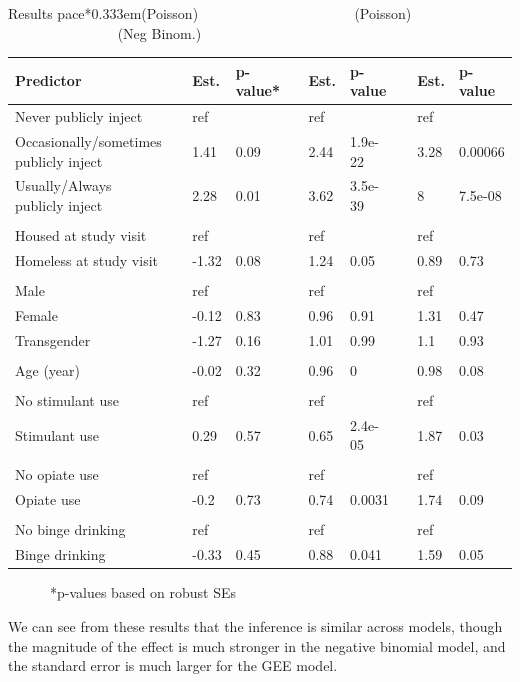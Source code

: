 \documentclass[ignorenonframetext,]{beamer}
\begin{document}
\begin{frame}{Results}
pace*{0.333em}\hspace*{0.333em}\hspace*{0.333em}\hspace*{0.333em}\hspace*{0.333em}\hspace*{0.333em}\hspace*{0.333em}\hspace*{0.333em}\hspace*{0.333em}\hspace*{0.333em}\hspace*{0.333em}(Poisson)
~~~~~~~~~~ ~~~~~~~~~~~(Poisson) ~~~~~~~~~~~~~~~ (Neg Binom.)

\vspace{-8pt}

\begin{longtable}[]{@{}llllllllll@{}}
\toprule
Predictor & & Est. & p-value* & & Est. & p-value & & Est. &
p-value\tabularnewline
\midrule
\endhead
Never publicly inject & & ref & & & ref & & & ref &\tabularnewline
Occasionally/sometimes publicly inject & & 1.41 & 0.09 & & 2.44 &
1.9e-22 & & 3.28 & 0.00066\tabularnewline
Usually/Always publicly inject & & 2.28 & 0.01 & & 3.62 & 3.5e-39 & & 8
& 7.5e-08\tabularnewline
& & & & & & & & &\tabularnewline
Housed at study visit & & ref & & & ref & & & ref &\tabularnewline
Homeless at study visit & & -1.32 & 0.08 & & 1.24 & 0.05 & & 0.89 &
0.73\tabularnewline
& & & & & & & & &\tabularnewline
Male & & ref & & & ref & & & ref &\tabularnewline
Female & & -0.12 & 0.83 & & 0.96 & 0.91 & & 1.31 & 0.47\tabularnewline
Transgender & & -1.27 & 0.16 & & 1.01 & 0.99 & & 1.1 &
0.93\tabularnewline
& & & & & & & & &\tabularnewline
Age (year) & & -0.02 & 0.32 & & 0.96 & 0 & & 0.98 & 0.08\tabularnewline
& & & & & & & & &\tabularnewline
No stimulant use & & ref & & & ref & & & ref &\tabularnewline
Stimulant use & & 0.29 & 0.57 & & 0.65 & 2.4e-05 & & 1.87 &
0.03\tabularnewline
& & & & & & & & &\tabularnewline
No opiate use & & ref & & & ref & & & ref &\tabularnewline
Opiate use & & -0.2 & 0.73 & & 0.74 & 0.0031 & & 1.74 &
0.09\tabularnewline
& & & & & & & & &\tabularnewline
No binge drinking & & ref & & & ref & & & ref &\tabularnewline
Binge drinking & & -0.33 & 0.45 & & 0.88 & 0.041 & & 1.59 &
0.05\tabularnewline
\bottomrule
\end{longtable}

\vspace{-14pt} ~~~~~~*p-values based on robust SEs

\footnotesize
We can see from these results that the inference is similar across
models, though the magnitude of the effect is much stronger in the
negative binomial model, and the standard error is much larger for the
GEE model.

\end{frame}
\end{document}
